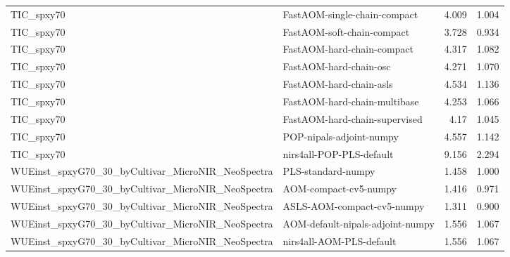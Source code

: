 \begin{landscape}
\begin{longtable}{L{8.0cm}L{9.5cm}rr}
TIC\_\allowbreak{}spxy70 & FastAOM-\allowbreak{}single-\allowbreak{}chain-\allowbreak{}compact & 4.009 & 1.004 \\
TIC\_\allowbreak{}spxy70 & FastAOM-\allowbreak{}soft-\allowbreak{}chain-\allowbreak{}compact & 3.728 & 0.934 \\
TIC\_\allowbreak{}spxy70 & FastAOM-\allowbreak{}hard-\allowbreak{}chain-\allowbreak{}compact & 4.317 & 1.082 \\
TIC\_\allowbreak{}spxy70 & FastAOM-\allowbreak{}hard-\allowbreak{}chain-\allowbreak{}osc & 4.271 & 1.070 \\
TIC\_\allowbreak{}spxy70 & FastAOM-\allowbreak{}hard-\allowbreak{}chain-\allowbreak{}asls & 4.534 & 1.136 \\
TIC\_\allowbreak{}spxy70 & FastAOM-\allowbreak{}hard-\allowbreak{}chain-\allowbreak{}multibase & 4.253 & 1.066 \\
TIC\_\allowbreak{}spxy70 & FastAOM-\allowbreak{}hard-\allowbreak{}chain-\allowbreak{}supervised & 4.17 & 1.045 \\
TIC\_\allowbreak{}spxy70 & POP-\allowbreak{}nipals-\allowbreak{}adjoint-\allowbreak{}numpy & 4.557 & 1.142 \\
TIC\_\allowbreak{}spxy70 & nirs4all-\allowbreak{}POP-\allowbreak{}PLS-\allowbreak{}default & 9.156 & 2.294 \\
WUEinst\_\allowbreak{}spxyG70\_\allowbreak{}30\_\allowbreak{}byCultivar\_\allowbreak{}MicroNIR\_\allowbreak{}NeoSpectra & PLS-\allowbreak{}standard-\allowbreak{}numpy & 1.458 & 1.000 \\
WUEinst\_\allowbreak{}spxyG70\_\allowbreak{}30\_\allowbreak{}byCultivar\_\allowbreak{}MicroNIR\_\allowbreak{}NeoSpectra & AOM-\allowbreak{}compact-\allowbreak{}cv5-\allowbreak{}numpy & 1.416 & 0.971 \\
WUEinst\_\allowbreak{}spxyG70\_\allowbreak{}30\_\allowbreak{}byCultivar\_\allowbreak{}MicroNIR\_\allowbreak{}NeoSpectra & ASLS-\allowbreak{}AOM-\allowbreak{}compact-\allowbreak{}cv5-\allowbreak{}numpy & 1.311 & 0.900 \\
WUEinst\_\allowbreak{}spxyG70\_\allowbreak{}30\_\allowbreak{}byCultivar\_\allowbreak{}MicroNIR\_\allowbreak{}NeoSpectra & AOM-\allowbreak{}default-\allowbreak{}nipals-\allowbreak{}adjoint-\allowbreak{}numpy & 1.556 & 1.067 \\
WUEinst\_\allowbreak{}spxyG70\_\allowbreak{}30\_\allowbreak{}byCultivar\_\allowbreak{}MicroNIR\_\allowbreak{}NeoSpectra & nirs4all-\allowbreak{}AOM-\allowbreak{}PLS-\allowbreak{}default & 1.556 & 1.067 \\

\end{longtable}
\end{landscape}
